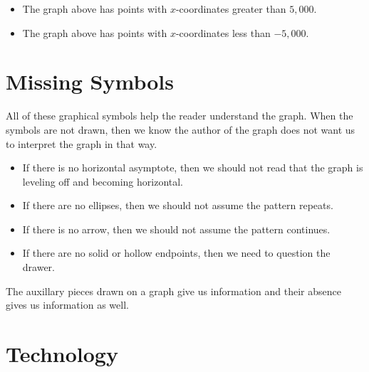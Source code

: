 \documentclass{ximera}
\begin{document}
\begin{question}
\begin{itemize}
\item The graph above has points with $x$-coordinates greater than $5,000$.
\begin{multipleChoice}
\end{multipleChoice}



\item The graph above has points with $x$-coordinates less than $-5,000$.
\begin{multipleChoice}
\end{multipleChoice}
\end{itemize}

\end{question}











\section{Missing Symbols}

All of these graphical symbols help the reader understand the graph.  When the symbols are not drawn, then we know the author of the graph does not want us to interpret the graph in that way.


\begin{itemize}
\item If there is no horizontal asymptote, then we should not read that the graph is leveling off and becoming horizontal.
\item If there are no ellipses, then we should not assume the pattern repeats.
\item If there is no arrow, then we should not assume the pattern continues.
\item If there are no solid or hollow endpoints, then we need to question the drawer.
\end{itemize}



The auxillary pieces drawn on a graph give us information and their absence gives us information as well.









\section{Technology}
\end{document}
